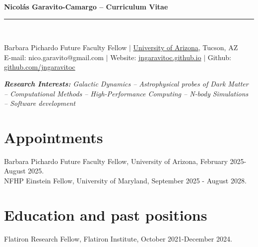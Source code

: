 \documentclass[14pt]{article}
\begin{document}
\begin{center}
\indent \textbf{\LARGE Nicol\'as Garavito-Camargo -- Curriculum Vitae} \\
\indent \rule{17cm}{0.4pt}\\
\end{center}

\fontsize{11}{11}\selectfont

\begin{center}
  Barbara Pichardo Future Faculty Fellow $|$
  \href{https://astro.arizona.edu/}
  {University of Arizona}, Tucson, AZ\\
E-mail: nico.garavito@gmail.com $|$ Website: \href{http://jngaravitoc.github.io/Garavito-Camargo}{jngaravitoc.github.io} $|$ Github: \href{http://www.github.com/jngaravitoc}{github.com/jngaravitoc}\\
\end{center}

\begin{center}
\textit{\textbf{Research Interests:} Galactic Dynamics -- Astrophysical probes
  of Dark Matter -- Computational Methods -- High-Performance Computing --
N-body Simulations -- Software development}\\
\end{center}




\section*{Appointments}

\indent Barbara Pichardo Future Faculty Fellow, University of Arizona, February
2025-August 2025. \\

\noindent NFHP Einstein Fellow, University of Maryland, September 2025 - August 2028. 


\section*{Education and past positions}


\indent Flatiron Research Fellow, Flatiron Institute, October 2021-December 2024.\\
\end{document}

